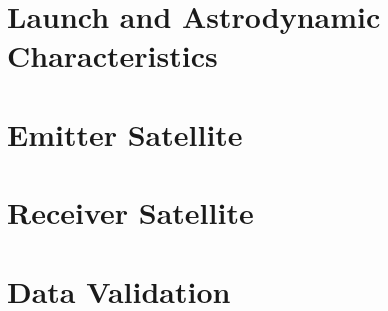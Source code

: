 \documentclass[11pt]{report}
\begin{document}
%
%
\chapter{Launch and Astrodynamic Characteristics}
\label{chap:astrodynamics}


%
%

\chapter{Emitter Satellite}
\label{chap:emitter}






%
%
	
\chapter{Receiver Satellite}
\label{chap:receiver}







%
%

\chapter{Data Validation}
\label{chap:sim}





%
%






%
%

%
%

%
%




%
%

\appendix
\end{document}

